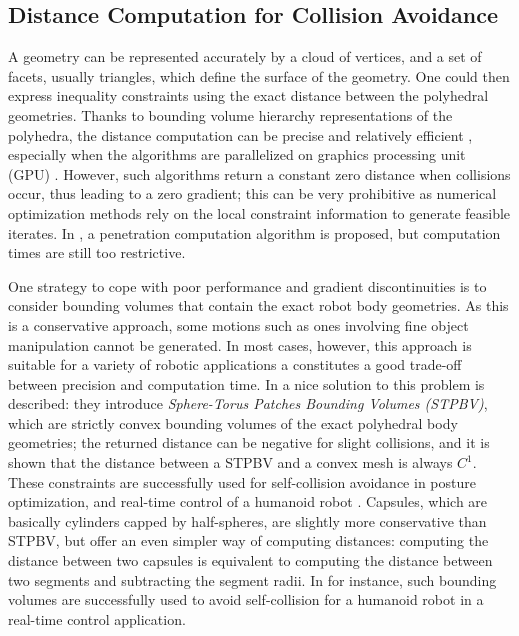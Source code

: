 \subsection{Distance Computation for Collision Avoidance}

A geometry can be represented accurately by a cloud of vertices, and a
set of facets, usually triangles, which define the surface of the
geometry. One could then express inequality constraints using the
exact distance between the polyhedral geometries. Thanks to bounding
volume hierarchy representations of the polyhedra, the distance
computation can be precise and relatively efficient \cite{Larsen2000},
especially when the algorithms are parallelized on graphics processing
unit (GPU) \cite{lauterbach2010gproximity}. However, such algorithms
return a constant zero distance when collisions occur, thus leading to
a zero gradient; this can be very prohibitive as numerical
optimization methods rely on the local constraint information to
generate feasible iterates. In \cite{Kim2002}, a penetration
computation algorithm is proposed, but computation times are still too
restrictive. 

One strategy to cope with poor performance and gradient
discontinuities is to consider bounding volumes that contain the exact
robot body geometries. As this is a conservative approach, some
motions such as ones involving fine object manipulation cannot be
generated. In most cases, however, this approach is suitable for a
variety of robotic applications a constitutes a good trade-off between
precision and computation time. In \cite{Escande2007} a nice solution
to this problem is described: they introduce \emph{Sphere-Torus
  Patches Bounding Volumes (STPBV)}, which are strictly convex
bounding volumes of the exact polyhedral body geometries; the returned
distance can be negative for slight collisions, and it is shown that
the distance between a STPBV and a convex mesh is always $C^1$. These
constraints are successfully used for self-collision avoidance in
posture optimization, and real-time control of a humanoid robot
\cite{Stasse2008}. Capsules, which are basically cylinders capped by
half-spheres, are slightly more conservative than STPBV, but offer an
even simpler way of computing distances: computing the distance
between two capsules is equivalent to computing the distance between
two segments and subtracting the segment radii. In \cite{Kanoun2011}
for instance, such bounding volumes are successfully used to avoid
self-collision for a humanoid robot in a real-time control
application.


